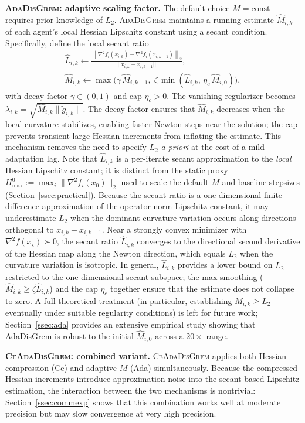 \documentclass[10pt,twocolumn,letterpaper]{article}
\def\norm#1{||#1||}%
\theoremstyle{compact}
\theoremstyle{compactremark}
\newcommand{\norm}[1]{\left\|#1\right\|}
\newcommand{\normtwo}[1]{\left\|#1\right\|_2}
\begin{document}
	\noindent\textbf{\textsc{AdaDisGrem}: adaptive scaling factor.}
	The default choice $M=\mathrm{const}$ requires prior knowledge of $L_2$.
	\textsc{AdaDisGrem} maintains a running estimate $\hat M_{i,k}$ of
	each agent's local Hessian Lipschitz constant using a secant condition.
	Specifically, define the local secant ratio
	\begin{gather*}
	\hat L_{i,k}\gets
	\frac{\normtwo{\nabla^2 f_i(x_{i,k})-\nabla^2 f_i(x_{i,k-1})}}
	     {\norm{x_{i,k}-x_{i,k-1}}},\\
	\hat M_{i,k}\gets \max\!\bigl(\gamma\,\hat M_{i,k-1},\;
	\zeta\,\min(\hat L_{i,k},\,\eta_c\,\hat M_{i,0})\bigr),
	\end{gather*}
	with decay factor $\gamma\in(0,1)$ and cap $\eta_c>0$.
	The vanishing regularizer becomes $\lambda_{i,k}=\sqrt{\hat M_{i,k}\|\tilde g_{i,k}\|}$.
	The decay factor ensures that $\hat M_{i,k}$ decreases when the local curvature
	stabilizes, enabling faster Newton steps near the solution; the cap prevents
	transient large Hessian increments from inflating the estimate.
	This mechanism removes the need to specify $L_2$ \emph{a priori}
	at the cost of a mild adaptation lag.
	Note that $\hat L_{i,k}$ is a per-iterate secant approximation to the
	\emph{local} Hessian Lipschitz constant; it is distinct from the
	static proxy $H_{\max}^0 := \max_i\|\nabla^2 f_i(x_0)\|_2$ used to
	scale the default $M$ and baseline stepsizes (Section~\ref{ssec:practical}).
	Because the secant ratio is a one-dimensional finite-difference
	approximation of the operator-norm Lipschitz constant, it may
	underestimate $L_2$ when the dominant curvature variation occurs
	along directions orthogonal to $x_{i,k}-x_{i,k-1}$.
	Near a strongly convex minimizer with $\nabla^2 f(x_\star)\succ 0$,
	the secant ratio $\hat L_{i,k}$ converges to the directional second
	derivative of the Hessian map along the Newton direction, which
	equals $L_2$ when the curvature variation is isotropic.
	In general, $\hat L_{i,k}$ provides a lower bound on $L_2$
	restricted to the one-dimensional secant subspace; the
	max-smoothing ($\hat M_{i,k}\ge\zeta\hat L_{i,k}$) and the cap
	$\eta_c$ together ensure that the estimate does not collapse to zero.
	A full theoretical treatment (in particular, establishing
	$\hat M_{i,k}\ge L_2$ eventually under suitable regularity
	conditions) is left for future work;
	Section~\ref{ssec:ada} provides an extensive empirical study showing
	that AdaDisGrem is robust to the initial $\hat M_{i,0}$ across a $20\times$ range.
	
	\vspace{1pt}
	\noindent\textbf{\textsc{CeAdaDisGrem}: combined variant.}
	\textsc{CeAdaDisGrem} applies both Hessian compression (Ce) and
	adaptive $M$ (Ada) simultaneously.
	Because the compressed Hessian increments introduce approximation noise
	into the secant-based Lipschitz estimation, the interaction between
	the two mechanisms is nontrivial: Section~\ref{ssec:commexp} shows
	that this combination works well at moderate precision but may slow
	convergence at very high precision.
	
\end{document}
